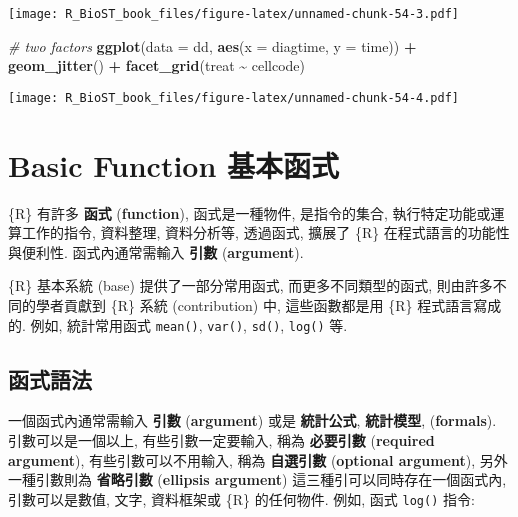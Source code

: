 \documentclass[
]{book}
\newenvironment{Shaded}{\begin{snugshade}}{\end{snugshade}}
\newcommand{\CommentTok}[1]{\textcolor[rgb]{0.56,0.35,0.01}{\textit{#1}}}
\newcommand{\DataTypeTok}[1]{\textcolor[rgb]{0.13,0.29,0.53}{#1}}
\newcommand{\KeywordTok}[1]{\textcolor[rgb]{0.13,0.29,0.53}{\textbf{#1}}}
\newcommand{\NormalTok}[1]{#1}
\newcommand{\OperatorTok}[1]{\textcolor[rgb]{0.81,0.36,0.00}{\textbf{#1}}}
\newcommand{\StringTok}[1]{\textcolor[rgb]{0.31,0.60,0.02}{#1}}
\begin{document}
\texttt{[image: R\_BioST\_book\_files/figure-latex/unnamed-chunk-54-3.pdf]}

\begin{Shaded}
\begin{Highlighting}[]
\CommentTok{\# two factors}
\KeywordTok{ggplot}\NormalTok{(}\DataTypeTok{data =}\NormalTok{ dd, }\KeywordTok{aes}\NormalTok{(}\DataTypeTok{x =}\NormalTok{ diagtime, }\DataTypeTok{y =}\NormalTok{ time)) }\OperatorTok{+}\StringTok{ }\KeywordTok{geom\_jitter}\NormalTok{() }\OperatorTok{+}\StringTok{ }
\StringTok{  }\KeywordTok{facet\_grid}\NormalTok{(treat }\OperatorTok{\textasciitilde{}}\StringTok{ }\NormalTok{cellcode)}
\end{Highlighting}
\end{Shaded}

\texttt{[image: R\_BioST\_book\_files/figure-latex/unnamed-chunk-54-4.pdf]}

\hypertarget{basic-function-ux57faux672cux51fdux5f0f}{%
\chapter{Basic Function 基本函式}\label{basic-function-ux57faux672cux51fdux5f0f}}

\{R\} 有許多
\textbf{函式}
(\textbf{function}),
函式是一種物件, 是指令的集合,
執行特定功能或運算工作的指令, 資料整理, 資料分析等,
透過函式,
擴展了 \{R\} 在程式語言的功能性與便利性.
函式內通常需輸入
\textbf{引數}
(\textbf{argument}).

\{R\} 基本系統 (base) 提供了一部分常用函式,
而更多不同類型的函式,
則由許多不同的學者貢獻到
\{R\} 系統 (contribution) 中,
這些函數都是用 \{R\} 程式語言寫成的.
例如, 統計常用函式
\texttt{mean()}, \texttt{var()}, \texttt{sd()}, \texttt{log()} 等.

\hypertarget{ux51fdux5f0fux8a9eux6cd5}{%
\section{函式語法}\label{ux51fdux5f0fux8a9eux6cd5}}

一個函式內通常需輸入
\textbf{引數}
(\textbf{argument})
或是
\textbf{統計公式},
\textbf{統計模型},
(\textbf{formals}).
引數可以是一個以上,
有些引數一定要輸入,
稱為
\textbf{必要引數}
(\textbf{required argument}),
有些引數可以不用輸入,
稱為
\textbf{自選引數}
(\textbf{optional argument}),
另外一種引數則為
\textbf{省略引數}
(\textbf{ellipsis argument})
這三種引可以同時存在一個函式內,
引數可以是數值, 文字, 資料框架或 \{R\} 的任何物件.
例如, 函式 \texttt{log()} 指令:
\end{document}
